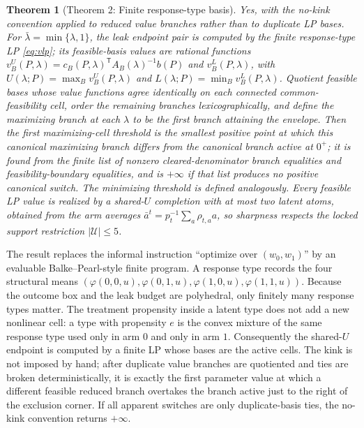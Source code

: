\documentclass[11pt]{article}
\theoremstyle{definition}
\theoremstyle{plain}
\newtheorem{theorem}{Theorem}
\theoremstyle{remark}
\begin{document}
\begin{theorem}[Theorem 2: Finite response-type basis]\label{thm:vertex}
Yes, with the no-kink convention applied to reduced value branches rather than to duplicate LP bases. For $\bar\lambda=\min\{\lambda,1\}$, the leak endpoint pair is computed by the finite response-type LP \eqref{eq:vlp}; its feasible-basis values are rational functions $v_B^U(P,\lambda)=c_B(P,\lambda)^\mathsf{T}A_B(\lambda)^{-1}b(P)$ and $v_B^L(P,\lambda)$, with $U(\lambda;P)=\max_B v_B^U(P,\lambda)$ and $L(\lambda;P)=\min_B v_B^L(P,\lambda)$. Quotient feasible bases whose value functions agree identically on each connected common-feasibility cell, order the remaining branches lexicographically, and define the maximizing branch at each $\lambda$ to be the first branch attaining the envelope. Then the first maximizing-cell threshold is the smallest positive point at which this canonical maximizing branch differs from the canonical branch active at $0^+$; it is found from the finite list of nonzero cleared-denominator branch equalities and feasibility-boundary equalities, and is $+\infty$ if that list produces no positive canonical switch. The minimizing threshold is defined analogously. Every feasible LP value is realized by a shared-$U$ completion with at most two latent atoms, obtained from the arm averages $\bar a^t=p_t^{-1}\sum_a\rho_{t,a}a$, so sharpness respects the locked support restriction $|\mathcal U|\le5$.
\end{theorem}

The result replaces the informal instruction ``optimize over $(w_0,w_1)$'' by an evaluable Balke--Pearl-style finite program. A response type records the four structural means \((\varphi(0,0,u),\varphi(0,1,u),\varphi(1,0,u),\varphi(1,1,u))\). Because the outcome box and the leak budget are polyhedral, only finitely many response types matter. The treatment propensity inside a latent type does not add a new nonlinear cell: a type with propensity \(e\) is the convex mixture of the same response type used only in arm \(0\) and only in arm \(1\). Consequently the shared-\(U\) endpoint is computed by a finite LP whose bases are the active cells. The kink is not imposed by hand; after duplicate value branches are quotiented and ties are broken deterministically, it is exactly the first parameter value at which a different feasible reduced branch overtakes the branch active just to the right of the exclusion corner. If all apparent switches are only duplicate-basis ties, the no-kink convention returns \(+\infty\).
\end{document}
